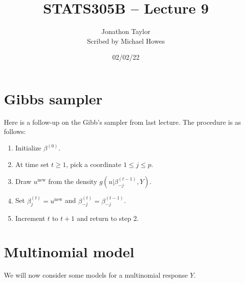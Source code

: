 




\title{STATS305B -- Lecture 9}
\author{Jonathon Taylor\\ Scribed by Michael Howes}
\date{02/02/22}

\pagestyle{fancy}
\fancyhf{}


\maketitle
\tableofcontents
\section{Gibbs sampler}
Here is a follow-up on the Gibb's sampler from last lecture. The procedure is as follows:
\begin{enumerate}
    \item Initialize $\beta^{(0)}$.
    \item At time set $t \ge 1$, pick a coordinate $1 \le j \le p$.
    \item Draw $u^{\text{new}}$ from the density $g(u|\beta_{-j}^{(t-1)}, Y)$.
    \item Set $\beta_j^{(t)}=u^{\text{new}}$ and $\beta_{-j}^{(t)} = \beta_{-j}^{(t-1)}$.
    \item Increment $t$ to $t+1$ and return to step 2.
\end{enumerate}
\section{Multinomial model}
We will now consider some models for a multinomial response $Y$.
